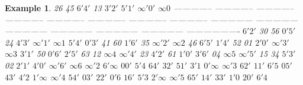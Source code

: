 \documentclass[
  11pt,
  a4paper]{book}
\newtheorem{example}{Example}
\begin{document}
\begin{example}
                       26             45           $6'4'$           13           $3'2'$         $5'1'$                     $\infty ' 0'$                    $\infty 0$                                                    
  -------------- -------------- -------------- -------------- -------------- -------------- -------------- -------------- --------------- --------------- --------------- --------------- --------------- --------------- -------------------
      $6'2'$                          30             56           $0'5'$           24           $4'3'$                                     $\infty ' 1'$                    $\infty 1$                                    
      $5'4'$         $0'3'$                          41             60           $1'6'$           35                                                       $\infty ' 2'$                    $\infty 2$                    
        46           $6'5'$         $1'4'$                          52             01           $2'0'$                                                                     $\infty ' 3'$                    $\infty 3$    
      $3'1'$           50           $0'6'$         $2'5'$                          63             12         $\infty 4$                                                                    $\infty ' 4'$                  
        23           $4'2'$           61           $1'0'$         $3'6'$                          04                        $\infty 5$                                                                     $\infty ' 5'$  
        15             34           $5'3'$           02           $2'1'$         $4'0'$                     $\infty' 6'$                    $\infty 6$                                                                    
                                 $\infty ' 2$                                                $6' \infty$       $00'$                           $5'4$           $64'$                           $32'$           $51'$             $3'1$
   $0' \infty$                                  $\infty ' 3$                                                   $62'$           $11'$                           $6'5$           $05'$                           $43'$             $4'2$
                  $1' \infty$                                  $\infty ' 4$                                    $54'$           $03'$           $22'$                           $0'6$           $16'$                             $5'3$
                                 $2' \infty$                                  $\infty ' 5$                                     $65'$           $14'$           $33'$                           $1'0$           $20'$             $6'4$

\end{example}
\end{document}
